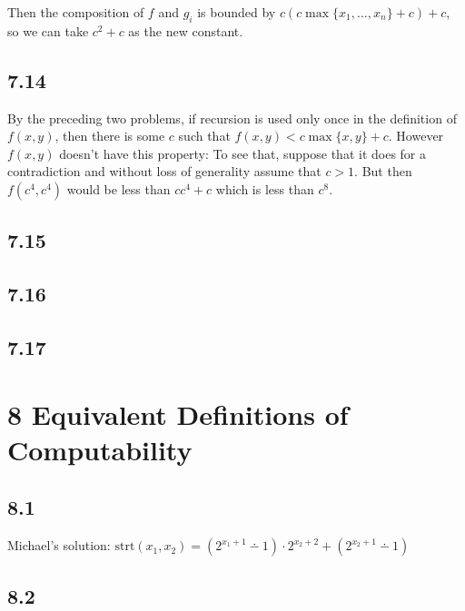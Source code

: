 \documentclass{article}
\newcommand\s{\section*}
\renewcommand\ss{\subsection*}
\newcommand\ms{Michael's solution: } %
\begin{document}
Then the composition of $f$ and $g_i$ is bounded by $c(c\max\{x_1,\ldots,x_n\} + c) + c$, so we
can take $c^2 + c$ as the new constant.
\ss{7.14}
By the preceding two problems, if recursion is used only once in the definition of $f(x,y)$,
then there is some $c$ such that $f(x,y) < c \max\{x,y\} + c$.  However $f(x,y)$ doesn't
have this property:  To see that, suppose that it does for a contradiction and without loss of generality assume that $c > 1$.  But then $f(c^4,c^4)$ would be less than $c c^4 + c$ which is less than $c^8$.
\ss{7.15}
\ss{7.16}
\ss{7.17}

\s{8 Equivalent Definitions of Computability}
\ss{8.1}
\ms $\mathrm{strt}(x_1,x_2) = (2^{x_1+1}\dotminus 1)\cdot 2^{x_2+2}+(2^{x_2+1}\dotminus 1)$
\ss{8.2}
\end{document}

